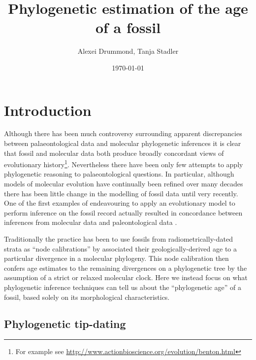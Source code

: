 \documentclass[11pt]{article}
\begin{document}
\title{Phylogenetic estimation of the age of a fossil}
\author{Alexei Drummond, Tanja Stadler}
\date{\today{}}
\maketitle

\section*{Introduction}


Although there has been much controversy surrounding apparent discrepancies between palaeontological data and molecular phylogenetic inferences it is clear that fossil and molecular data both produce broadly concordant views of evolutionary history\footnote{For example see \url{http://www.actionbioscience.org/evolution/benton.html}}. Nevertheless there have been only few attempts to apply phylogenetic reasoning to palaeontological questions. In particular, although models of molecular evolution have continually been refined over many decades there has been little change in the modelling of fossil data until very recently. One of the first examples of endeavouring to apply an evolutionary model to perform inference on the fossil record actually resulted in concordance between inferences from  molecular data and paleontological data \autocite{tavare2002using}. 

Traditionally the practice has been to use fossils from radiometrically-dated strata as ``node calibrations'' by associated their geologically-derived age to a particular divergence in a molecular phylogeny. This node calibration then confers age estimates to the remaining divergences on a phylogenetic tree by the assumption of a strict or relaxed molecular clock. 
Here we instead focus on what phylogenetic inference techniques can tell us about the ``phylogenetic age'' of a fossil, based solely on its morphological characteristics.

\subsection*{Phylogenetic tip-dating}
\end{document}
